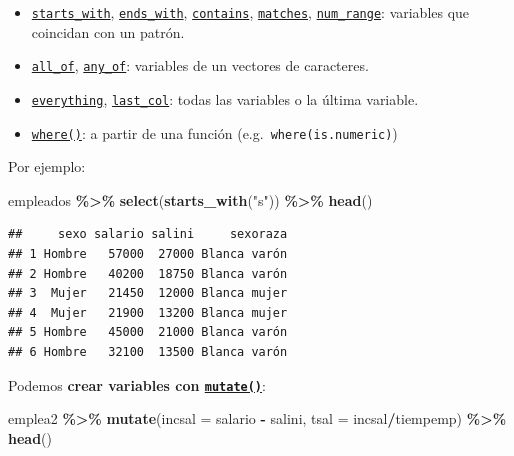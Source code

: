 \documentclass[
]{book}
\newenvironment{Shaded}{\begin{snugshade}}{\end{snugshade}}
\newcommand{\AttributeTok}[1]{\textcolor[rgb]{0.13,0.29,0.53}{#1}}
\newcommand{\FunctionTok}[1]{\textcolor[rgb]{0.13,0.29,0.53}{\textbf{#1}}}
\newcommand{\NormalTok}[1]{#1}
\newcommand{\SpecialCharTok}[1]{\textcolor[rgb]{0.81,0.36,0.00}{\textbf{#1}}}
\newcommand{\StringTok}[1]{\textcolor[rgb]{0.31,0.60,0.02}{#1}}
\begin{document}
\begin{itemize}
\item
  \href{https://tidyselect.r-lib.org/reference/starts_with.html}{\texttt{starts\_with}}, \href{https://tidyselect.r-lib.org/reference/starts_with.html}{\texttt{ends\_with}}, \href{https://tidyselect.r-lib.org/reference/starts_with.html}{\texttt{contains}}, \href{https://tidyselect.r-lib.org/reference/starts_with.html}{\texttt{matches}}, \href{https://tidyselect.r-lib.org/reference/starts_with.html}{\texttt{num\_range}}: variables que coincidan con un patrón.
\item
  \href{https://tidyselect.r-lib.org/reference/all_of.html}{\texttt{all\_of}}, \href{https://tidyselect.r-lib.org/reference/all_of.html}{\texttt{any\_of}}: variables de un vectores de caracteres.
\item
  \href{https://tidyselect.r-lib.org/reference/everything.html}{\texttt{everything}}, \href{https://tidyselect.r-lib.org/reference/everything.html}{\texttt{last\_col}}: todas las variables o la última variable.
\item
  \href{https://tidyselect.r-lib.org/reference/where.html}{\texttt{where()}}: a partir de una función (e.g.~\texttt{where(is.numeric)})
\end{itemize}

Por ejemplo:

\begin{Shaded}
\begin{Highlighting}[]
\NormalTok{empleados }\SpecialCharTok{\%\textgreater{}\%} \FunctionTok{select}\NormalTok{(}\FunctionTok{starts\_with}\NormalTok{(}\StringTok{"s"}\NormalTok{)) }\SpecialCharTok{\%\textgreater{}\%} \FunctionTok{head}\NormalTok{()}
\end{Highlighting}
\end{Shaded}

\begin{verbatim}
##     sexo salario salini     sexoraza
## 1 Hombre   57000  27000 Blanca varón
## 2 Hombre   40200  18750 Blanca varón
## 3  Mujer   21450  12000 Blanca mujer
## 4  Mujer   21900  13200 Blanca mujer
## 5 Hombre   45000  21000 Blanca varón
## 6 Hombre   32100  13500 Blanca varón
\end{verbatim}

Podemos \textbf{crear variables con \href{https://dplyr.tidyverse.org/reference/mutate.html}{\texttt{mutate()}}}:

\begin{Shaded}
\begin{Highlighting}[]
\NormalTok{emplea2 }\SpecialCharTok{\%\textgreater{}\%} 
  \FunctionTok{mutate}\NormalTok{(}\AttributeTok{incsal =}\NormalTok{ salario }\SpecialCharTok{{-}}\NormalTok{ salini, }\AttributeTok{tsal =}\NormalTok{ incsal}\SpecialCharTok{/}\NormalTok{tiempemp) }\SpecialCharTok{\%\textgreater{}\%} 
  \FunctionTok{head}\NormalTok{()}
\end{Highlighting}
\end{Shaded}
\end{document}
